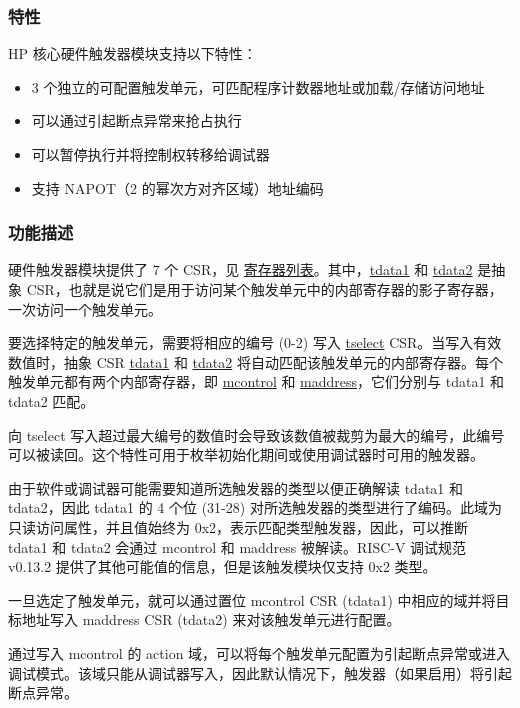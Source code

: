 \documentclass[main\_\_CN.tex]{subfiles}
\begin{document}
\subsubsection{特性}
\label{sec:riscvcpu-hwt-features}

HP 核心硬件触发器模块支持以下特性：

\begin{itemize}
    \item 3 个独立的可配置触发单元，可匹配程序计数器地址或加载/存储访问地址
    \item 可以通过引起断点异常来抢占执行
    \item 可以暂停执行并将控制权转移给调试器
    \item 支持 NAPOT（2 的幂次方对齐区域）地址编码
\end{itemize}

\subsubsection{功能描述}
\label{sec:riscvcpu-hwt-func-descr}

硬件触发器模块提供了 7 个 CSR，见 \hyperref[sec:riscvcpu-hwt-reg-summ]{寄存器列表}。其中，\hyperref[regdesc:TDATA1]{tdata1} 和 \hyperref[regdesc:TDATA2]{tdata2} 是抽象 CSR，也就是说它们是用于访问某个触发单元中的内部寄存器的影子寄存器，一次访问一个触发单元。

要选择特定的触发单元，需要将相应的编号 (0-2) 写入 \hyperref[regdesc:TSELECT]{tselect} CSR。当写入有效数值时，抽象 CSR \hyperref[regdesc:TDATA1]{tdata1} 和 \hyperref[regdesc:TDATA2]{tdata2} 将自动匹配该触发单元的内部寄存器。每个触发单元都有两个内部寄存器，即 \hyperref[regdesc:MCONTROL]{mcontrol} 和 \hyperref[regdesc:MADDRESS]{maddress}，它们分别与 tdata1 和 tdata2 匹配。

向 tselect 写入超过最大编号的数值时会导致该数值被裁剪为最大的编号，此编号可以被读回。这个特性可用于枚举初始化期间或使用调试器时可用的触发器。

由于软件或调试器可能需要知道所选触发器的类型以便正确解读 tdata1 和 tdata2，因此 tdata1 的 4 个位 (31-28) 对所选触发器的类型进行了编码。此域为只读访问属性，并且值始终为 0x2，表示匹配类型触发器，因此，可以推断 tdata1 和 tdata2 会通过 mcontrol 和 maddress 被解读。RISC-V 调试规范 v0.13.2 提供了其他可能值的信息，但是该触发模块仅支持 0x2 类型。

一旦选定了触发单元，就可以通过置位 mcontrol CSR (tdata1) 中相应的域并将目标地址写入 maddress CSR (tdata2) 来对该触发单元进行配置。

通过写入 mcontrol 的 action 域，可以将每个触发单元配置为引起断点异常或进入调试模式。该域只能从调试器写入，因此默认情况下，触发器（如果启用）将引起断点异常。
\end{document}
